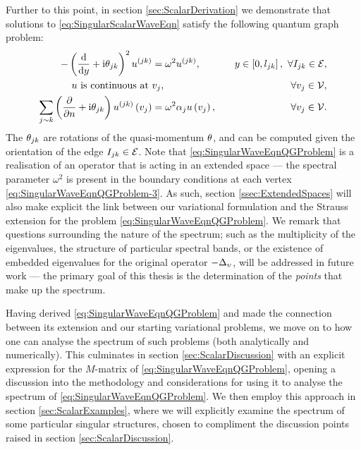 Further to this point, in section \ref{sec:ScalarDerivation} we demonstrate that solutions to \eqref{eq:SingularScalarWaveEqn} satisfy the following quantum graph problem:
\begin{subequations} \label{eq:SingularWaveEqnQGProblem}
	\begin{align}
		-\left( \dfrac{\mathrm{d}}{\mathrm{d}y} + \mathrm{i}\theta_{jk} \right)^2 u^{(jk)} &= \omega^2 u^{(jk)}, \quad &y\in\left[ 0,l_{jk} \right], \ \forall I_{jk}\in\mathcal{E}, \label{eq:SingularWaveEqnQGProblem-1} \\
		u \text{ is continuous at } & v_j, \quad &\forall v_j\in\mathcal{V}, \label{eq:SingularWaveEqnQGProblem-2} \\
		\sum_{j\sim k}\left( \dfrac{\partial }{\partial n} + \mathrm{i}\theta_{jk} \right)u^{(jk)}\left( v_j \right) &= \omega^2\alpha_j u\left( v_j \right), \quad &\forall v_j\in\mathcal{V}. \label{eq:SingularWaveEqnQGProblem-3}
	\end{align}
\end{subequations}
The $\theta_{jk}$ are rotations of the quasi-momentum $\theta$, and can be computed given the orientation of the edge $I_{jk}\in\mathcal{E}$.
Note that \eqref{eq:SingularWaveEqnQGProblem} is a realisation of an operator that is acting in an extended space --- the spectral parameter $\omega^2$ is present in the boundary conditions at each vertex \eqref{eq:SingularWaveEqnQGProblem-3}.
As such, section \ref{ssec:ExtendedSpaces} will also make explicit the link between our variational formulation and the Strauss extension for the problem \eqref{eq:SingularWaveEqnQGProblem}.
We remark that questions surrounding the nature of the spectrum; such as the multiplicity of the eigenvalues, the structure of particular spectral bands, or the existence of embedded eigenvalues for the original operator $-\Delta_{\upsilon}$, will be addressed in future work --- the primary goal of this thesis is the determination of the \emph{points} that make up the spectrum.

Having derived \eqref{eq:SingularWaveEqnQGProblem} and made the connection between its extension and our starting variational problems, we move on to how one can analyse the spectrum of such problems (both analytically and numerically).
This culminates in section \ref{sec:ScalarDiscussion} with an explicit expression for the $M$-matrix of \eqref{eq:SingularWaveEqnQGProblem}, opening a discussion into the methodology and considerations for using it to analyse the spectrum of \eqref{eq:SingularWaveEqnQGProblem}.
We then employ this approach in section \ref{sec:ScalarExamples}, where we will explicitly examine the spectrum of some particular singular structures, chosen to compliment the discussion points raised in section \ref{sec:ScalarDiscussion}.

